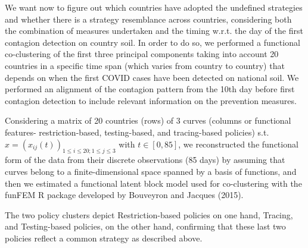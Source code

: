 \documentclass[
  6pt,
]{article}
\begin{document}
We want now to figure out which countries have adopted the undefined
strategies and whether there is a strategy resemblance across countries,
considering both the combination of measures undertaken and the timing
w.r.t. the day of the first contagion detection on country soil. In
order to do so, we performed a functional co-clustering of the first
three principal components taking into account 20 countries in a
specific time span (which varies from country to country) that depends
on when the first COVID cases have been detected on national soil. We
performed an alignment of the contagion pattern from the 10th day before
first contagion detection to include relevant information on the
prevention measures.

Considering a matrix of 20 countries (rows) of 3 curves (columns or
functional features- restriction-based, testing-based, and tracing-based
policies) s.t. \(x=(x_{ij}(t))_{1\leq i \leq 20; 1 \leq j\leq3}\) with
\(t \in [0,85]\), we reconstructed the functional form of the data from
their discrete observations (85 days) by assuming that curves belong to
a finite-dimensional space spanned by a basis of functions, and then we
estimated a functional latent block model used for co-clustering with
the funFEM R package developed by Bouveyron and Jacques (2015).

The two policy clusters depict Restriction-based policies on one hand,
Tracing, and Testing-based policies, on the other hand, confirming that
these last two policies reflect a common strategy as described above.
\end{document}
